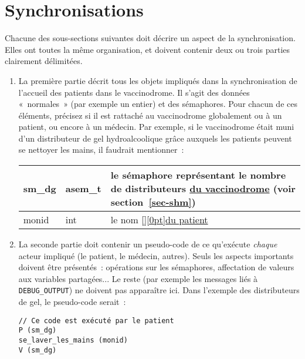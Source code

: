 \documentclass[a4paper]{article}
\makeatletter
\newenvironment{expl}{%
  \begin{list}{}{%
    \small\itshape%
    \topsep\z@%
    \listparindent0pt%
    \parsep0.75\baselineskip%
    \setlength{\leftmargin}{20mm}%
    \setlength{\rightmargin}{20mm}%
  }
    \item[]}%
    {\end{list}}
\makeatother
\begin{document}
  \section{Synchronisations}

  \begin{expl}
    Chacune des sous-sections suivantes doit décrire un aspect de la
    synchronisation. Elles ont toutes la même organisation, et doivent
    contenir deux ou trois parties clairement délimitées.

    \begin{enumerate}

      \item La première partie décrit tous les objets impliqués dans la
      synchronisation de l'accueil des patients dans le vaccinodrome. Il
      s'agit des données «~normales~» (par exemple un entier) et des
      sémaphores. Pour chacun de ces éléments, précisez si il est
      rattaché au vaccinodrome globalement ou à un patient, ou encore à
      un médecin. Par exemple, si le vaccinodrome était muni d'un
      distributeur de gel hydroalcoolique grâce auxquels les patients
      peuvent se nettoyer les mains, il faudrait mentionner~:

      \begin{tabularx}{\linewidth}{|l|l|>{\strut}X|}
        \hline%
        sm\_dg & asem\_t & le sémaphore représentant le nombre de
        distributeurs \underline{du vaccinodrome} (voir
        section~\ref{sec-shm}) \\ \hline%
        monid & int & le nom %
        \underline{\raisebox{0pt}[\height][0pt]{du patient}} \\ \hline%
      \end{tabularx}

      \item La seconde partie doit contenir un pseudo-code de ce
      qu'exécute \emph{chaque} acteur impliqué (le patient, le médecin,
      autres). Seuls les aspects importants doivent être présentés~:
      opérations sur les sémaphores, affectation de valeurs aux
      variables partagées... Le reste (par exemple les messages liés à
      \texttt{DEBUG\_OUTPUT}) ne doivent pas apparaître ici. Dans
      l'exemple des distributeurs de gel, le pseudo-code serait~:

      \begin{verbatim}
// Ce code est exécuté par le patient
P (sm_dg)
se_laver_les_mains (monid)
V (sm_dg)
      \end{verbatim}


\end{enumerate}
\end{expl}
\end{document}
